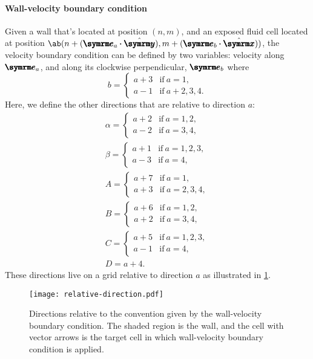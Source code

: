 \paragraph{Wall-velocity boundary condition} Given a wall that's located at position $(n, m)$, and an exposed fluid cell located at position $\ab(n + (\vv{e}_a\vdot\yhat), m + (\vv{e}_b\vdot\xhat))$, the velocity boundary condition can be defined by two variables: velocity along $\vv{e}_a$, and along its clockwise perpendicular, $\vv{e}_b$ where
\begin{equation}
	b = \begin{cases}
		a + 3 & \textrm{if} ~ a = 1,       \\
		a - 1 & \textrm{if} ~ a + 2, 3, 4.
	\end{cases}
\end{equation}
Here, we define the other directions that are relative to direction $a$:
\begin{gather}
	\alpha = \begin{cases}
		a + 2 & \textrm{if} ~ a = 1, 2, \\
		a - 2 & \textrm{if} ~ a = 3, 4,
	\end{cases} \\
	\beta = \begin{cases}
		a + 1 & \textrm{if} ~ a = 1, 2, 3, \\
		a - 3 & \textrm{if} ~ a = 4,
	\end{cases} \\
	A = \begin{cases}
		a + 7 & \textrm{if} ~ a = 1,       \\
		a + 3 & \textrm{if} ~ a = 2, 3, 4,
	\end{cases} \\
	B = \begin{cases}
		a + 6 & \textrm{if} ~ a = 1, 2, \\
		a + 2 & \textrm{if} ~ a = 3, 4,
	\end{cases} \\
	C = \begin{cases}
		a + 5 & \textrm{if} ~ a = 1, 2, 3, \\
		a - 1 & \textrm{if} ~ a = 4,
	\end{cases} \\
	D = a + 4.
\end{gather}
These directions live on a grid relative to direction $a$ as illustrated in \cref{fig:relative-direction}.
\begin{figure}[ht]
	\centering
	\texttt{[image: relative-direction.pdf]}
	\caption{Directions relative to the convention given by the wall-velocity boundary condition. The shaded region is the wall, and the cell with vector arrows is the target cell in which wall-velocity boundary condition is applied.}
	\label{fig:relative-direction}
\end{figure}

